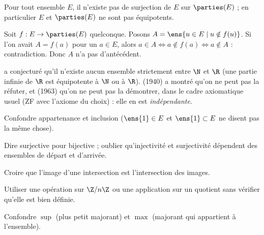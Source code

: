 \begin{theoreme}\label{thm-cantor-parties}
Pour tout ensemble $E$, il n'existe pas de surjection de $E$ sur $\parties(E)$ ; en particulier $E$ et $\parties(E)$ ne sont pas équipotents.
\end{theoreme}
\begin{preuve}
Soit $f:E\to\parties(E)$ quelconque. Posons $A=\ens{u\in E\mid u\notin f(u)}$. Si l'on avait $A=f(a)$ pour un $a\in E$, alors $a\in A\iff a\notin f(a)\iff a\notin A$ : contradiction. Donc $A$ n'a pas d'antécédent.
\end{preuve}
\begin{histoire}
 a conjecturé qu'il n'existe aucun ensemble \og strictement entre \fg{} $\N$ et $\R$ (une partie infinie de $\R$ est équipotente à $\N$ ou à $\R$).  (1940) a montré qu'on ne peut pas la réfuter, et  (1963) qu'on ne peut pas la démontrer, dans le cadre axiomatique usuel (ZF avec l'axiome du choix) : elle en est \emph{indépendante}.
\end{histoire}

\begin{erreurs}
\item Confondre appartenance et inclusion ($\ens{1}\in E$ et $\ens{1}\subset E$ ne disent pas la même chose).
\item Dire \og surjective \fg{} pour \og bijective \fg ; oublier qu'injectivité et surjectivité dépendent des ensembles de départ et d'arrivée.
\item Croire que l'image d'une intersection est l'intersection des images.
\item Utiliser une opération sur $\Z/n\Z$ ou une application sur un quotient sans vérifier qu'elle est bien définie.
\item Confondre $\sup$ (plus petit majorant) et $\max$ (majorant qui appartient à l'ensemble).
\end{erreurs}

\exercices


